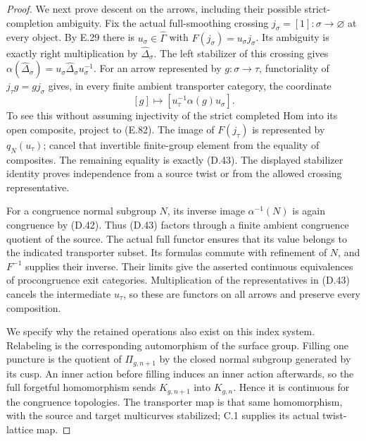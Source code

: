 \begin{proof}
We next prove descent on the arrows, including their
possible strict-completion ambiguity.  Fix the actual
full-smoothing crossing $j_\sigma=[1]:\sigma\to\varnothing$
at every object.  By E.29 there is $u_\sigma\in
\widehat\Gamma$ with $F(j_\sigma)=u_\sigma j_\sigma$.
Its ambiguity is exactly right multiplication by
$\widehat\Delta_\sigma$.  The left stabilizer of this
crossing gives
$\alpha(\widehat\Delta_\sigma)=
u_\sigma\widehat\Delta_\sigma u_\sigma^{-1}$.
For an arrow represented by $g:\sigma\to\tau$,
functoriality of $j_\tau g=g j_\sigma$ gives, in every
finite ambient transporter category, the coordinate
\[
       [g]\longmapsto
       [u_\tau^{-1}\alpha(g)u_\sigma].                       \tag{D.43}
\]
To see this without assuming injectivity of the strict
completed Hom into its open composite, project to (E.82).
The image of $F(j_\tau)$ is represented by $q_N(u_\tau)$;
cancel that invertible finite-group element from the
equality of composites.  The remaining equality is exactly
(D.43).  The displayed stabilizer identity proves
independence from a source twist or from the allowed
crossing representative.

For a congruence normal subgroup $N$, its inverse image
$\alpha^{-1}(N)$ is again congruence by (D.42).  Thus
(D.43) factors through a finite ambient congruence
quotient of the source.  The actual full functor ensures
that its value belongs to the indicated transporter
subset.  Its formulas commute with refinement of $N$,
and $F^{-1}$ supplies their inverse.  Their limits give
the asserted continuous equivalences of procongruence
exit categories.  Multiplication of the representatives
in (D.43) cancels the intermediate $u_\tau$, so these
are functors on all arrows and preserve every composition.

We specify why the retained operations also exist on this
index system.  Relabeling is the corresponding automorphism
of the surface group.  Filling one puncture is the quotient
of $\Pi_{g,n+1}$ by the closed normal subgroup generated by
its cusp.  An inner action before filling induces an inner
action afterwards, so the full forgetful homomorphism sends
$K_{g,n+1}$ into $K_{g,n}$.  Hence it is continuous for
the congruence topologies.  The transporter map is that
same homomorphism, with the source and target multicurves
stabilized; C.1 supplies its actual twist-lattice map.


\end{proof}

